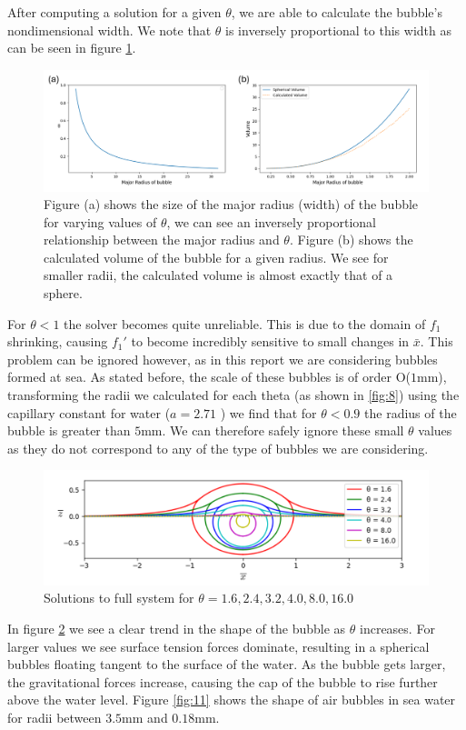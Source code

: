 After computing a solution for a given $\theta$, we are able to calculate the bubble's nondimensional width. We note that $\theta$ is inversely proportional to this width as can be seen in figure \ref{fig:10}.
\begin{figure}
    \centering
    \includegraphics[width=0.85\linewidth]{WriteUp/images/Radius and volume.png}
    \caption{Figure (a) shows the size of the major radius (width) of the bubble for varying values of $\theta$, we can see an inversely proportional relationship between the major radius and $\theta$. Figure (b) shows the calculated volume of the bubble for a given radius. We see for smaller radii, the calculated volume is almost exactly that of a sphere.}
    \label{fig:10}
\end{figure}

For $\theta<1$ the solver becomes quite unreliable. This is due to the domain of $f_1$ shrinking, causing $f_1'$ to become incredibly sensitive to small changes in $\bar{x}$. This problem can be ignored however, as in this report we are considering bubbles formed at sea. As stated before, the scale of these bubbles is of order O($1$mm), transforming the radii we calculated for each theta (as shown in \ref{fig:8}) using the capillary constant for water ($a=2.71$ \cite{rapp2016microfluidics}) we find that for $\theta<0.9$ the radius of the bubble is greater than $5$mm. We can therefore safely ignore these small $\theta$ values as they do not correspond to any of the type of bubbles we are considering.
\begin{figure}
    \centering
    \includegraphics[width=0.85\linewidth]{WriteUp/images/many bubbles ontop one another.png}
    \caption{Solutions to full system for $\theta=1.6,2.4,3.2,4.0,8.0,16.0$}
    \label{fig:9}
\end{figure}
In figure \ref{fig:9} we see a clear trend in the shape of the bubble as $\theta$ increases. For larger values we see surface tension forces dominate, resulting in a spherical bubbles floating tangent to the surface of the water. As the bubble gets larger, the gravitational forces increase, causing the cap of the bubble to rise further above the water level. Figure \ref{fig:11} shows the shape of air bubbles in sea water for radii between $3.5$mm and $0.18$mm.

